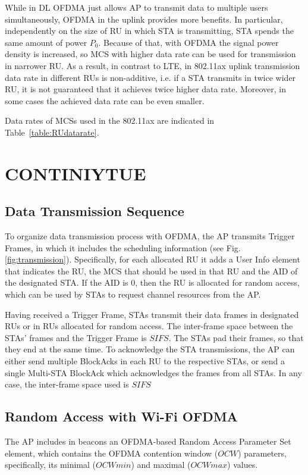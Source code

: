 While in DL OFDMA just allows AP to transmit data to multiple users simultaneously, OFDMA in the uplink provides more benefits. In particular, independently on the size of RU in which STA is transmitting, STA spends the same amount of power $P_0$. Because of that, with OFDMA the signal power density is increased, so MCS with higher data rate can be used for transmission in narrower RU. As a result, in contrast to LTE, in 802.11ax uplink transmission data rate in different RUs is non-additive, i.e. if a STA transmits in twice wider RU, it is not guaranteed that it achieves twice higher data rate. Moreover, in some cases the achieved data rate can be even smaller.

Data rates of MCSs used in the 802.11ax are indicated in Table~\ref{table:RUdatarate}.

\clearpage
\section{CONTINIYTUE}
\subsection{Data Transmission Sequence}
To organize data transmission process with OFDMA, the AP transmits Trigger Frames, in which it includes the scheduling information (see Fig. \ref{fig:transmission}).
Specifically, for each allocated RU it adds a User Info element that indicates the RU, the MCS that should be used in that RU and the AID of the designated STA.
If the AID is $0$, then the RU is allocated for random access, which can be used by STAs to request channel resources from the AP.

Having received a Trigger Frame, STAs transmit their data frames in designated RUs or in RUs allocated for random access.
The inter-frame space between the STAs' frames and the Trigger Frame is $SIFS$.
The STAs pad their frames, so that they end at the same time.
To acknowledge the STA transmissions, the AP can either send multiple BlockAcks in each RU to the respective STAs, or send a single Multi-STA BlockAck which acknowledges the frames from all STAs.
In any case, the inter-frame space used is $SIFS$

\subsection{Random Access with Wi-Fi OFDMA}
The AP includes in beacons an OFDMA-based Random Access Parameter Set element, which contains the OFDMA contention window ($OCW$) parameters, specifically, its minimal ($OCWmin$) and maximal ($OCWmax$) values.

